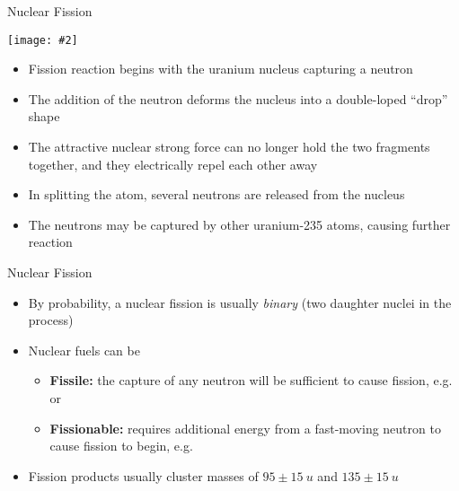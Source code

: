 \documentclass[12pt,compress,aspectratio=169]{beamer}
\newcommand{\pic}[2]{\texttt{[image: \#2]}}
\begin{document}
\begin{frame}{Nuclear Fission}
  \begin{center}
    \pic{.5}{graphics/fission1}
  \end{center}
  \begin{itemize}
  \item\vspace{-.25in}Fission reaction begins with the uranium nucleus
    capturing a neutron
  \item The addition of the neutron deforms the nucleus into a double-loped
    ``drop'' shape
  \item The attractive nuclear strong force can no longer hold the two fragments
    together, and they electrically repel each other away
  \item In splitting the atom, several neutrons are released from the nucleus
  \item The neutrons may be captured by other uranium-235 atoms, causing further
    reaction
  \end{itemize}
\end{frame}



\begin{frame}{Nuclear Fission}
  \begin{itemize}
  \item By probability, a nuclear fission is usually \emph{binary} (two
    daughter nuclei in the process)
  \item Nuclear fuels can be
    \begin{itemize}
    \item\textbf{Fissile:} the capture of any neutron will be sufficient to
      cause fission, e.g.\  or 
    \item\textbf{Fissionable:} requires additional energy from a fast-moving
      neutron to cause fission to begin, e.g.\ 
    \end{itemize}
  \item Fission products usually cluster masses of $95\pm\SI{15}{u}$ and
    $135\pm\SI{15}{u}$
  \end{itemize}
\end{frame}
\end{document}
